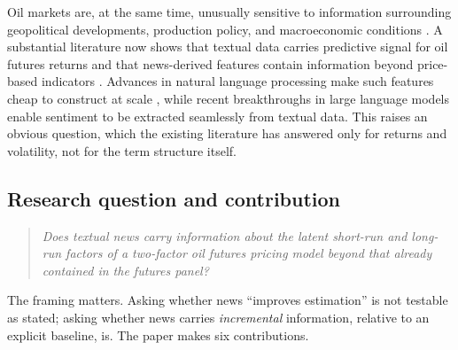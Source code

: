 \documentclass[journal]{IEEEtran}
\begin{document}
Oil markets are, at the same time, unusually sensitive to information surrounding geopolitical developments, production policy, and macroeconomic conditions \cite{KilianMurphy2014}. A substantial literature now shows that textual data carries predictive signal for oil futures returns \cite{Pan2024} and that news-derived features contain information beyond price-based indicators \cite{Gong2022}. Advances in natural language processing make such features cheap to construct at scale \cite{Araci2019}, while recent breakthroughs in large language models enable sentiment to be extracted seamlessly from textual data. This raises an obvious question, which the existing literature has answered only for returns and volatility, not for the term structure itself.

\subsection{Research question and contribution}

\begin{quote}
\textit{Does textual news carry information about the latent short-run and long-run factors of a two-factor oil futures pricing model beyond that already contained in the futures panel?}
\end{quote}

The framing matters. Asking whether news ``improves estimation'' is not testable as stated; asking whether news carries \emph{incremental} information, relative to an explicit baseline, is. The paper makes six contributions.
\end{document}
